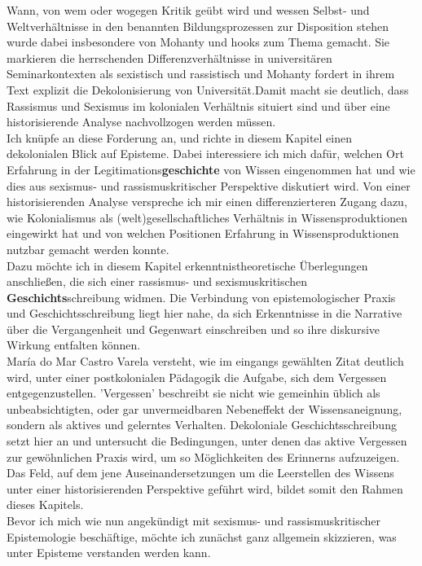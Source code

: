 \noindent Wann, von wem oder wogegen Kritik geübt wird und wessen Selbst- und
Weltverhältnisse in den benannten Bildungsprozessen zur Disposition stehen wurde
dabei insbesondere von Mohanty und hooks zum Thema gemacht. Sie markieren die
herrschenden Differenzverhältnisse in universitären Seminarkontexten als
sexistisch und rassistisch und Mohanty fordert in ihrem Text explizit die
Dekolonisierung von Universität.Damit macht sie deutlich, dass Rassismus und
Sexismus im kolonialen Verhältnis situiert sind und über eine historisierende
Analyse nachvollzogen werden müssen.\\
Ich knüpfe an diese Forderung an, und
richte in diesem Kapitel einen dekolonialen Blick auf Episteme. Dabei
interessiere ich mich dafür, welchen Ort Erfahrung in der
Legitimations\textbf{geschichte} von Wissen eingenommen hat und wie dies aus sexismus-
und rassismuskritischer Perspektive diskutiert wird. Von einer historisierenden
Analyse verspreche ich mir einen differenzierteren Zugang dazu, wie
Kolonialismus als (welt)gesellschaftliches Verhältnis in Wissensproduktionen
eingewirkt hat und von welchen Positionen Erfahrung in Wissensproduktionen
nutzbar gemacht werden konnte.\\
Dazu möchte ich in diesem Kapitel erkenntnistheoretische Überlegungen
anschließen, die sich einer rassismus- und sexismuskritischen
\textbf{Geschichts}schreibung widmen. Die Verbindung von  epistemologischer Praxis und
Geschichtsschreibung liegt hier nahe, da sich Erkenntnisse in die Narrative
über die Vergangenheit und Gegenwart einschreiben und so ihre diskursive Wirkung
entfalten können.\\

María do Mar Castro Varela versteht, wie im eingangs gewählten Zitat deutlich
wird, unter einer postkolonialen Pädagogik die Aufgabe, sich dem Vergessen
entgegenzustellen. 'Vergessen' beschreibt sie nicht wie gemeinhin üblich als
unbeabsichtigten, oder gar unvermeidbaren Nebeneffekt der Wissensaneignung,
sondern als aktives und gelerntes Verhalten. Dekoloniale Geschichtsschreibung
setzt hier an und untersucht die Bedingungen, unter denen das aktive Vergessen
zur gewöhnlichen Praxis wird, um so Möglichkeiten des Erinnerns aufzuzeigen. Das
Feld, auf dem jene Auseinandersetzungen um die Leerstellen des Wissens unter
einer historisierenden Perspektive geführt wird, bildet somit den Rahmen dieses
Kapitels.\\
Bevor ich mich wie nun angekündigt mit sexismus- und rassismuskritischer
Epistemologie beschäftige, möchte ich zunächst ganz allgemein skizzieren, was
unter Episteme verstanden werden kann.\\

